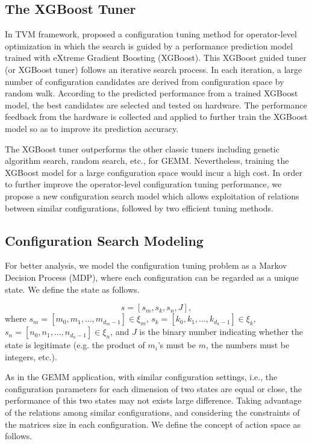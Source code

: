 \subsection{The XGBoost Tuner}

In TVM framework, \cite{Tianqi2018} proposed a configuration tuning method for operator-level optimization in which the search is guided by a performance prediction model trained with eXtreme Gradient Boosting (XGBoost). This XGBoost guided tuner (or XGBoost tuner) follows an iterative search process. In each iteration, a large number of configuration candidates are derived from configuration space by random walk. According to the predicted performance from a trained XGBoost model, the best candidates are selected and tested on hardware. The performance feedback from the hardware is collected and applied to further train the XGBoost model so as to improve its prediction accuracy.

The XGBoost tuner outperforms the other classic tuners including genetic algorithm search, random search, etc., for GEMM. Nevertheless, training the XGBoost model for a large configuration space would incur a high cost. In order to further improve the operator-level configuration tuning performance, we propose a new configuration search model which allows exploitation of relations between similar configurations, followed by two efficient tuning methods.


\subsection{Configuration Search Modeling}

For better analysis, we model the configuration tuning problem as a Markov Decision Process (MDP), where each configuration can be regarded as a unique state. We define the state as follows.

\begin{equation}
    s = \left[ s_m, s_k, s_n, J \right],
\end{equation}
where $s_m = \left[ m_0, m_1, \ldots, m_{d_m-1} \right] \in \xi_m$, $s_k = \left[ k_0, k_1, \ldots, k_{d_k-1} \right] \in \xi_k$, $s_n = \left[ n_0, n_1, \ldots, n_{d_n-1} \right] \in \xi_n$, and $J$ is the binary number indicating whether the state is legitimate (e.g. the product of $m_i$'s must be $m$, the numbers must be integers, etc.).

As in the GEMM application, with similar configuration settings, i.e., the configuration parameters for each dimension of two states are equal or close, the performance of this two states may not exists large difference. Taking advantage of the relations among similar configurations, and considering the constraints of the matrices size in each configuration. We define the concept of action space as follows.

